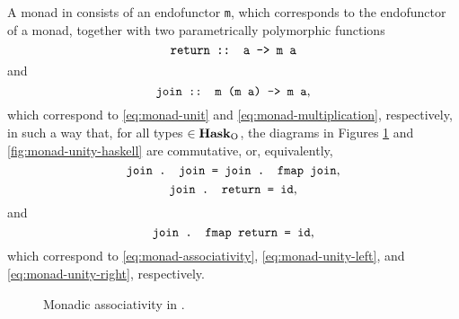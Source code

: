 A monad in \hask consists of an endofunctor \texttt{m}, which
corresponds to the endofunctor of a monad, together with two
parametrically polymorphic functions
\begin{equation}
  \label{eq:monad-return-haskell}
  \text{\texttt{return :: a -> m a}}
\end{equation}
and
\begin{equation}
  \label{eq:monad-join-haskell}
  \text{\texttt{join :: m (m a) -> m a}}
  \text{,}
\end{equation}
which correspond to \eqref{eq:monad-unit} and
\eqref{eq:monad-multiplication}, respectively, in such a way that, for
all types  $\in \mathcal{\mathbf{Hask}}_{\operatorname{O}}$, the diagrams in Figures
\ref{fig:monad-associativity-haskell} and
\ref{fig:monad-unity-haskell} are commutative, or, equivalently,
\begin{equation}
  \label{eq:monad-associativity-haskell}
  \text{\texttt{join . join = join . fmap join}}
  \text{,}
\end{equation}
\begin{equation}
  \label{eq:monad-unity-left-haskell}
  \text{\texttt{join . return = id}}
  \text{,}
\end{equation}
and
\begin{equation}
  \label{eq:monad-unity-right-haskell}
  \text{\texttt{join . fmap return = id}}
  \text{,}
\end{equation}
which correspond to \eqref{eq:monad-associativity},
\eqref{eq:monad-unity-left}, and \eqref{eq:monad-unity-right},
respectively.
\begin{figure}[htb]
  \begin{center}
  \end{center}
  \caption{Monadic associativity in \hask.}
  \label{fig:monad-associativity-haskell}
\end{figure}
